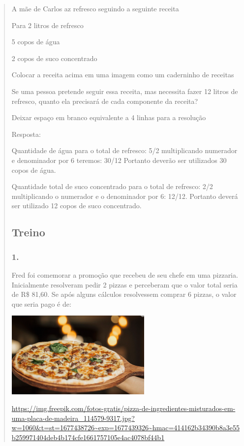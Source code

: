 \begin{enumerate}
\begin{escolha}
\begin{enumerate}
\begin{itemize}
\begin{itemize}
\begin{escolha}
\begin{quote}
\begin{escolha}
{A mãe de Carlos az refresco seguindo a seguinte receita

Para 2 litros de refresco

5 copos de água

2 copos de suco concentrado

Colocar a receita acima em uma imagem como um caderninho de receitas

Se uma pessoa pretende seguir essa receita, mas necessita fazer 12
litros de refresco, quanto ela precisará de cada componente da receita?

Deixar espaço em branco equivalente a 4 linhas para a resolução

Resposta:

Quantidade de água para o total de refresco: 5/2 multiplicando numerador
e denominador por 6 teremos: 30/12 Portanto deverão ser utilizados 30
copos de água.

Quantidade total de suco concentrado para o total de refresco: 2/2
multiplicando o numerador e o denominador por 6: 12/12. Portanto deverá
ser utilizado 12 copos de suco concentrado.

\subsection{Treino}\label{treino-9}

\subsubsection{1.}\label{section-127}

Fred foi comemorar a promoção que recebeu de seu chefe em uma pizzaria.
Inicialmente resolveram pedir 2 pizzas e perceberam que o valor total
seria de R\$ 81,60. Se após alguns cálculos resolvessem comprar 6
pizzas, o valor que seria pago é de:

\includegraphics[width=2.80000in,height=1.66867in]{media/image132.png}

\url{https://img.freepik.com/fotos-gratis/pizza-de-ingredientes-misturados-em-uma-placa-de-madeira_114579-9317.jpg?w=1060\&t=st=1677438726~exp=1677439326~hmac=414162b34390b8a3e55b259971404deb4b174cfe1661757105e4ac4078bf44b1}

}
\end{escolha}
\end{quote}
\end{escolha}
\end{itemize}
\end{itemize}
\end{enumerate}
\end{escolha}
\end{enumerate}
